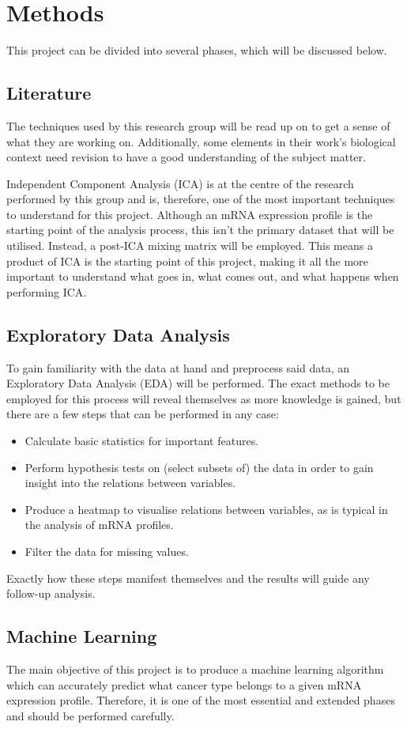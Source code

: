\chapter{Methods}
This project can be divided into several phases, which will be discussed below.

\section{Literature}
The techniques used by this research group will be read up on to get a sense of what they are working on.
Additionally, some elements in their work's biological context need revision to have a good understanding of the subject matter.

Independent Component Analysis (ICA) is at the centre of the research performed by this group and is, therefore, one of the most important techniques to understand for this project.
Although an mRNA expression profile is the starting point of the analysis process, this isn’t the primary dataset that will be utilised.
Instead, a post-ICA mixing matrix will be employed.
This means a product of ICA is the starting point of this project, making it all the more important to understand what goes in, what comes out, and what happens when performing ICA.

\section{Exploratory Data Analysis}
To gain familiarity with the data at hand and preprocess said data, an Exploratory Data Analysis (EDA) will be performed.
The exact methods to be employed for this process will reveal themselves as more knowledge is gained, but there are a few steps that can be performed in any case:
\begin{itemize}
    \item Calculate basic statistics for important features.
    \item Perform hypothesis tests on (select subsets of) the data in order to gain insight into the relations between variables.
    \item Produce a heatmap to visualise relations between variables, as is typical in the analysis of mRNA profiles.
    \item Filter the data for missing values.
\end{itemize}
Exactly how these steps manifest themselves and the results will guide any follow-up analysis.

\section{Machine Learning}
The main objective of this project is to produce a machine learning algorithm which can accurately predict what cancer type belongs to a given mRNA expression profile.
Therefore, it is one of the most essential and extended phases and should be performed carefully.

